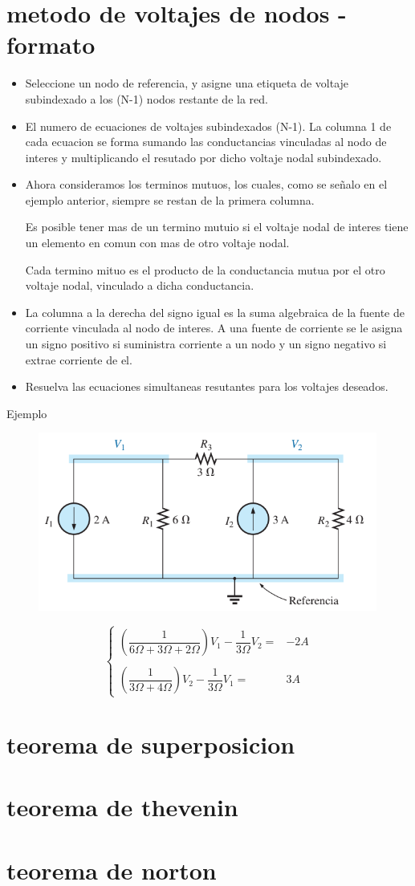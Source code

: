\section*{metodo de voltajes de nodos - formato}
\begin{itemize}
	\justifying
	\item Seleccione un nodo de referencia, y asigne una etiqueta de voltaje subindexado a los (N-1) nodos restante de la red.
	\item El numero de ecuaciones de voltajes subindexados (N-1). La columna 1 de cada ecuacion se forma sumando las conductancias vinculadas al nodo de interes y multiplicando el resutado por dicho voltaje nodal subindexado.
	\item Ahora consideramos los terminos mutuos, los cuales, como se señalo en el ejemplo anterior, siempre se restan de la primera columna.
	
	Es posible tener mas de un termino mutuio si el voltaje nodal de interes tiene un elemento en comun con mas de otro voltaje nodal.
	
	Cada termino mituo es el producto de la conductancia mutua por el otro voltaje nodal, vinculado a dicha conductancia.
	\item La columna a la derecha del signo igual es la suma algebraica de la fuente de corriente vinculada al nodo de interes. A una fuente de corriente se le asigna un signo positivo si suministra corriente a un nodo y un signo negativo si extrae corriente de el.
	\item Resuelva las ecuaciones simultaneas resutantes para los voltajes deseados. 
\end{itemize}
Ejemplo
\begin{figure}
	\centering
	\includegraphics[width=0.7\linewidth]{imagenes/screenshot004}
	\label{fig:screenshot004}
\end{figure}
\[
\left \{
\begin{array}{rr}
	\left( \dfrac{1}{6 \Omega + 3 \Omega + 2 \Omega} \right)  V_1 - \dfrac{1}{3 \Omega} V_2  =& - 2 A \\\\
	\left( \dfrac{1}{3 \Omega + 4 \Omega } \right) V_2 - \dfrac{1}{3 \Omega} V_1 =& 3 A
\end{array}
\right .
\]
\section*{teorema de superposicion}
\section*{teorema de thevenin}
\section*{teorema de norton}